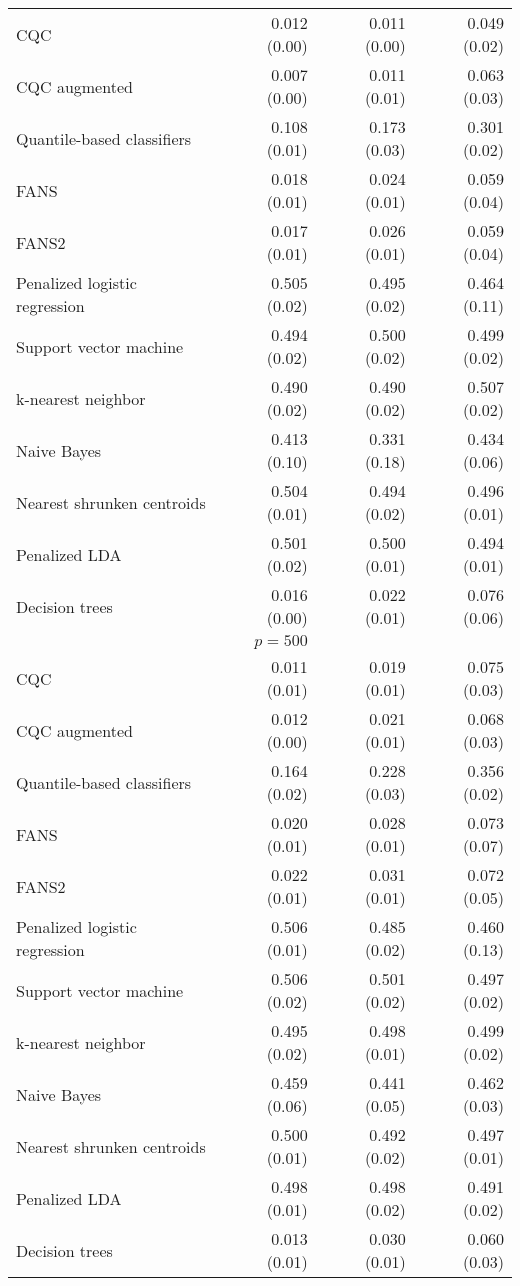 \begin{table}[p]
\begin{adjustbox}{max size={\textwidth}{10cm}}
\begin{tabular}{l@{\extracolsep{15mm}}rrr}
      CQC & 0.012 (0.00) & 0.011 (0.00) & 0.049 (0.02) \\ 
      CQC augmented & 0.007 (0.00) & 0.011 (0.01) & 0.063 (0.03) \\ 
      Quantile-based classifiers & 0.108 (0.01) & 0.173 (0.03) & 0.301 (0.02) \\ 
      FANS  & 0.018 (0.01) & 0.024 (0.01) & 0.059 (0.04) \\
      FANS2 & 0.017 (0.01) & 0.026 (0.01) & 0.059 (0.04) \\
      Penalized logistic regression & 0.505 (0.02) & 0.495 (0.02) & 0.464 (0.11) \\ 
      Support vector machine & 0.494 (0.02) & 0.500 (0.02) & 0.499 (0.02) \\ 
      k-nearest neighbor & 0.490 (0.02) & 0.490 (0.02) & 0.507 (0.02) \\ 
      Naive Bayes & 0.413 (0.10) & 0.331 (0.18) & 0.434 (0.06) \\ 
      Nearest shrunken centroids & 0.504 (0.01) & 0.494 (0.02) & 0.496 (0.01) \\ 
      Penalized LDA & 0.501 (0.02) & 0.500 (0.01) & 0.494 (0.01) \\ 
      Decision trees & 0.016 (0.00) & 0.022 (0.01) & 0.076 (0.06) \\ [2ex]

      \hline
      & $p = 500$ \\
      \hline

      CQC & 0.011 (0.01) & 0.019 (0.01) & 0.075 (0.03) \\ 
      CQC augmented & 0.012 (0.00) & 0.021 (0.01) & 0.068 (0.03) \\ 
      Quantile-based classifiers & 0.164 (0.02) & 0.228 (0.03) & 0.356 (0.02) \\ 
      FANS  & 0.020 (0.01) & 0.028 (0.01) & 0.073 (0.07) \\
      FANS2 & 0.022 (0.01) & 0.031 (0.01) & 0.072 (0.05) \\
      Penalized logistic regression & 0.506 (0.01) & 0.485 (0.02) & 0.460 (0.13) \\ 
      Support vector machine & 0.506 (0.02) & 0.501 (0.02) & 0.497 (0.02) \\ 
      k-nearest neighbor & 0.495 (0.02) & 0.498 (0.01) & 0.499 (0.02) \\ 
      Naive Bayes & 0.459 (0.06) & 0.441 (0.05) & 0.462 (0.03) \\ 
      Nearest shrunken centroids & 0.500 (0.01) & 0.492 (0.02) & 0.497 (0.01) \\ 
      Penalized LDA & 0.498 (0.01) & 0.498 (0.02) & 0.491 (0.02) \\ 
      Decision trees & 0.013 (0.01) & 0.030 (0.01) & 0.060 (0.03) \\ 

      \hline
      
    \end{tabular}
  \end{adjustbox}
\end{table}




